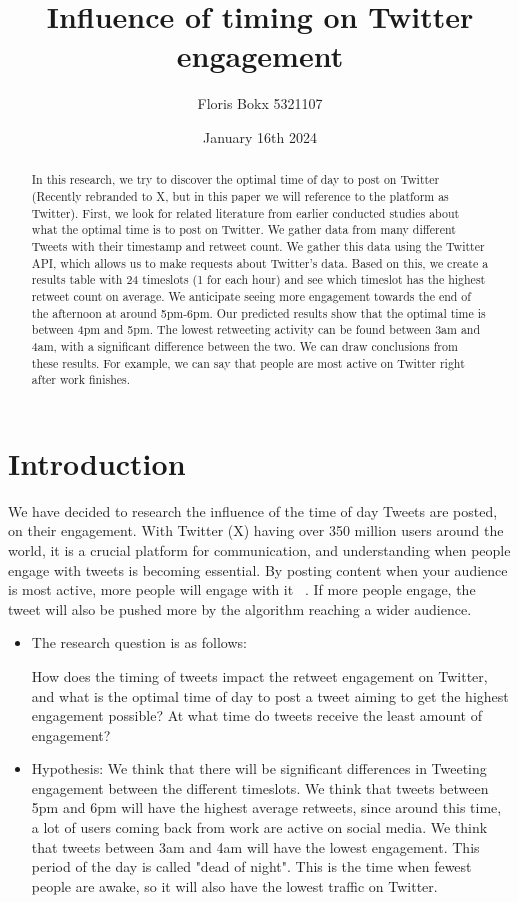 \documentclass[11pt]{article}
\title{Influence of timing on Twitter engagement}
\author{Floris Bokx 5321107\\}
\date{January 16th 2024}
\begin{document}
\maketitle

\begin{abstract}
In this research, we try to discover the optimal time of day to post on Twitter (Recently rebranded to X, but in this paper we will reference to the platform as Twitter). First, we look for related literature from earlier conducted studies about what the optimal time is to post on Twitter. We gather data from many different Tweets with their timestamp and retweet count. We gather this data using the Twitter API, which allows us to make requests about Twitter's data. Based on this, we create a results table with 24 timeslots (1 for each hour) and see which timeslot has the highest retweet count on average. We anticipate seeing more engagement towards the end of the afternoon at around 5pm-6pm. Our predicted results show that the optimal time is between 4pm and 5pm. The lowest retweeting activity can be found between 3am and 4am, with a significant difference between the two. We can draw conclusions from these results. For example, we can say that people are most active on Twitter right after work finishes. 

\end{abstract}


\section{Introduction}
We have decided to research the influence of the time of day Tweets are posted, on their engagement. With Twitter (X) having over 350 million users around the world, it is a crucial platform for communication, and understanding when people engage with tweets is becoming essential. By posting content when your audience is most active, more people will engage with it ~\citep{AIContentfy:2023}. If more people engage, the tweet will also be pushed more by the algorithm reaching a wider audience.

\begin{itemize}
\item The research question is as follows: 

How does the timing of tweets impact the retweet engagement on Twitter, and what is the optimal time of day to post a tweet aiming to get the highest engagement possible? At what time do tweets receive the least amount of engagement?

\item Hypothesis: We think that there will be significant differences in Tweeting engagement between the different timeslots. We think that tweets between 5pm and 6pm will have the highest average retweets, since around this time, a lot of users coming back from work are active on social media. We think that tweets between 3am and 4am will have the lowest engagement. This period of the day is called "dead of night". This is the time when fewest people are awake, so it will also have the lowest traffic on Twitter.


\end{itemize}
\end{document}
